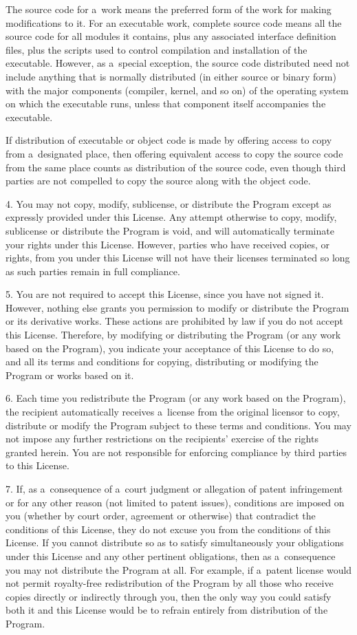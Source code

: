 \documentclass[a4paper, 11pt, twoside]{article}
\begin{document}
The source code for a~work means the preferred form of the work for making modifications to it. For an executable work, complete source code means all the source code for all modules it contains, plus any associated interface definition files, plus the scripts used to control compilation and installation of the executable. However, as a~special exception, the source code distributed need not include anything that is normally distributed (in either source or binary form) with the major components (compiler, kernel, and so on) of the operating system on which the executable runs, unless that component itself accompanies the executable.

If distribution of executable or object code is made by offering access to copy from a~designated place, then offering equivalent access to copy the source code from the same place counts as distribution of the source code, even though third parties are not compelled to copy the source along with the object code.

4. You may not copy, modify, sublicense, or distribute the Program except as expressly provided under this License. Any attempt otherwise to copy, modify, sublicense or distribute the Program is void, and will automatically terminate your rights under this License. However, parties who have received copies, or rights, from you under this License will not have their licenses terminated so long as such parties remain in full compliance.

5. You are not required to accept this License, since you have not signed it. However, nothing else grants you permission to modify or distribute the Program or its derivative works. These actions are prohibited by law if you do not accept this License. Therefore, by modifying or distributing the Program (or any work based on the Program), you indicate your acceptance of this License to do so, and all its terms and conditions for copying, distributing or modifying the Program or works based on it.

6. Each time you redistribute the Program (or any work based on the Program), the recipient automatically receives a~license from the original licensor to copy, distribute or modify the Program subject to these terms and conditions. You may not impose any further restrictions on the recipients' exercise of the rights granted herein. You are not responsible for enforcing compliance by third parties to this License.

7. If, as a~consequence of a~court judgment or allegation of patent infringement or for any other reason (not limited to patent issues), conditions are imposed on you (whether by court order, agreement or otherwise) that contradict the conditions of this License, they do not excuse you from the conditions of this License. If you cannot distribute so as to satisfy simultaneously your obligations under this License and any other pertinent obligations, then as a~consequence you may not distribute the Program at all. For example, if a~patent license would not permit royalty-free redistribution of the Program by all those who receive copies directly or indirectly through you, then the only way you could satisfy both it and this License would be to refrain entirely from distribution of the Program.
\end{document}
